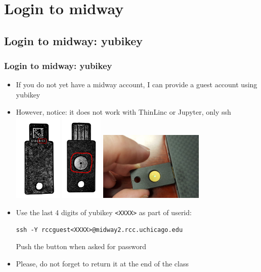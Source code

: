 \documentclass{beamer}
\begin{document}
\section{Login to midway}
\subsection{Login to midway: yubikey}
\begin{frame}[fragile]
  \frametitle{Login to midway: yubikey}
  \begin{itemize}
    \item If you do not yet have a midway account, I can provide a guest account using yubikey
    \item However, notice: it does not work with ThinLinc or Jupyter, only ssh
    \includegraphics[width=2.3cm]{icons/yubikey1a.jpg}
    \includegraphics[width=2cm]{icons/yubikey2a.jpg}
    \includegraphics[width=5cm]{icons/yubikey3a.jpg}
  \item Use the last 4 digits of yubikey {\color{mycolorcli}\verb|<XXXX>|} as part of userid:
    {\color{mycolorcli}
\begin{verbatim}                                                                                                                                                                              
ssh -Y rccguest<XXXX>@midway2.rcc.uchicago.edu                                                                                                                                                
\end{verbatim}
    }
    Push the button when asked for password
  \item Please, do not forget to return it at the end of the class
  \end{itemize}
\end{frame}
\end{document}
